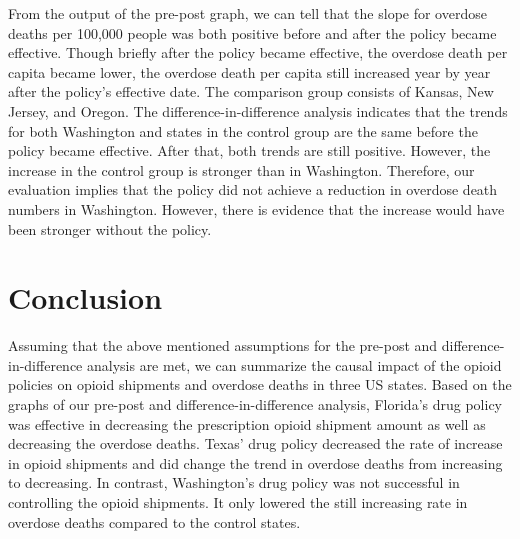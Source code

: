 \documentclass[12pt,letterpaper]{article}
\begin{document}
From the output of the pre-post graph, we can tell that the slope for overdose deaths per 100,000 people was both positive before and after the policy became effective. Though briefly after the policy became effective, the overdose death per capita became lower, the overdose death per capita still increased year by year after the policy's effective date. The comparison group consists of Kansas, New Jersey, and Oregon. The difference-in-difference analysis indicates that the trends for both Washington and states in the control group are the same before the policy  became effective. After that, both trends are still positive. However, the increase in the control group is stronger than in Washington. Therefore, our evaluation implies that the policy did not achieve a reduction in overdose death numbers in Washington. However, there is evidence that the increase would have been stronger without the policy.


\section{Conclusion}

Assuming that the above mentioned assumptions for the pre-post and difference-in-difference analysis are met, we can summarize the causal impact of the opioid policies on opioid shipments and overdose deaths in three US states. Based on the graphs of our pre-post and difference-in-difference analysis, Florida's drug policy was effective in decreasing the prescription opioid shipment amount as well as decreasing the overdose deaths. Texas' drug policy decreased the rate of increase in opioid shipments and did change the trend in overdose deaths from increasing to decreasing. In contrast, Washington's drug policy was not successful in controlling the opioid shipments. It only lowered the still increasing rate in overdose deaths compared to the control states.
\end{document}
